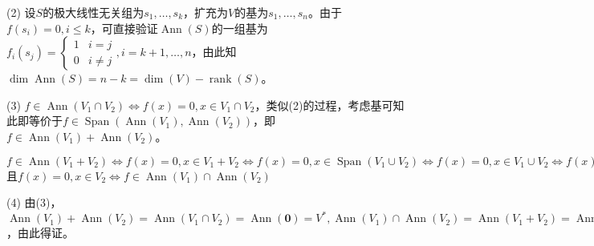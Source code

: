 \documentclass[a4paper,UTF8,fontset=windows]{ctexart}
\DeclareMathOperator{\Ann}{Ann}
\DeclareMathOperator{\rank}{rank}
\DeclareMathOperator{\Span}{Span}
\begin{document}
\begin{enumerate}
(2) 设$S$的极大线性无关组为$s_1,\dots,s_k$，扩充为$V$的基为$s_1,\dots,s_n$。由于$f(s_i)=0,i\le k$，可直接验证$\Ann(S)$的一组基为$f_i(s_j)=\begin{cases}1&i=j\\0&i\ne j\end{cases},i=k+1,\dots,n$，由此知$\dim\Ann(S)=n-k=\dim(V)-\rank(S)$。

(3) $f\in\Ann(V_1\cap V_2)\Leftrightarrow f(x)=0,x\in V_1\cap V_2$，类似(2)的过程，考虑基可知此即等价于$f\in\Span(\Ann(V_1),\Ann(V_2))$，即$f\in\Ann(V_1)+\Ann(V_2)$。

$f\in\Ann(V_1+V_2)\Leftrightarrow f(x)=0,x\in V_1+V_2\Leftrightarrow f(x)=0,x\in\Span(V_1\cup V_2)\Leftrightarrow f(x)=0,x\in V_1\cup V_2\Leftrightarrow f(x)=0,x\in V_1$且$f(x)=0,x\in V_2\Leftrightarrow f\in\Ann(V_1)\cap\Ann(V_2)$

(4) 由(3)，$\Ann(V_1)+\Ann(V_2)=\Ann(V_1\cap V_2)=\Ann(\mathbf{0})=V^*,\Ann(V_1)\cap\Ann(V_2)=\Ann(V_1+V_2)=\Ann(V)=\mathbf{0}$，由此得证。
\end{enumerate}
\end{document}
